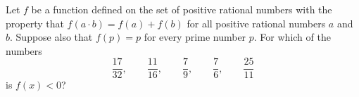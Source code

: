 Let $f$ be a function defined on the set of positive rational numbers with the property that $f(a\cdot b)=f(a)+f(b)$ for all positive rational numbers $a$ and $b$. Suppose also that $f(p)=p$ for every prime number $p$. For which of the numbers
\[\dfrac{17}{32},\qquad\dfrac{11}{16},\qquad\dfrac79,\qquad\dfrac76,\qquad\dfrac{25}{11}\]
is $f(x)<0$?
